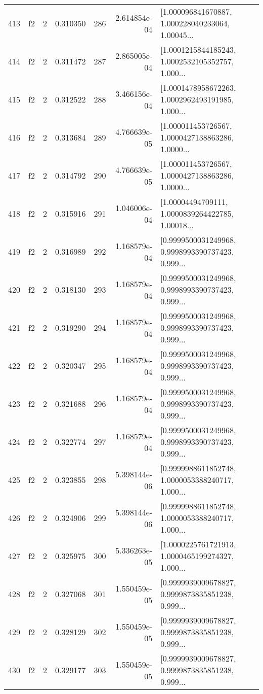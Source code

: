 \begin{tabular}{lllrlrl}
413 &  f2 &   2 &  0.310350 &  286 &  2.614854e-04 &  [1.000096841670887, 1.000228040233064, 1.00045... \\
414 &  f2 &   2 &  0.311472 &  287 &  2.865005e-04 &  [1.0001215844185243, 1.0002532105352757, 1.000... \\
415 &  f2 &   2 &  0.312522 &  288 &  3.466156e-04 &  [1.0001478958672263, 1.0002962493191985, 1.000... \\
416 &  f2 &   2 &  0.313684 &  289 &  4.766639e-05 &  [1.000011453726567, 1.0000427138863286, 1.0000... \\
417 &  f2 &   2 &  0.314792 &  290 &  4.766639e-05 &  [1.000011453726567, 1.0000427138863286, 1.0000... \\
418 &  f2 &   2 &  0.315916 &  291 &  1.046006e-04 &  [1.00004494709111, 1.0000839264422785, 1.00018... \\
419 &  f2 &   2 &  0.316989 &  292 &  1.168579e-04 &  [0.9999500031249968, 0.9998993390737423, 0.999... \\
420 &  f2 &   2 &  0.318130 &  293 &  1.168579e-04 &  [0.9999500031249968, 0.9998993390737423, 0.999... \\
421 &  f2 &   2 &  0.319290 &  294 &  1.168579e-04 &  [0.9999500031249968, 0.9998993390737423, 0.999... \\
422 &  f2 &   2 &  0.320347 &  295 &  1.168579e-04 &  [0.9999500031249968, 0.9998993390737423, 0.999... \\
423 &  f2 &   2 &  0.321688 &  296 &  1.168579e-04 &  [0.9999500031249968, 0.9998993390737423, 0.999... \\
424 &  f2 &   2 &  0.322774 &  297 &  1.168579e-04 &  [0.9999500031249968, 0.9998993390737423, 0.999... \\
425 &  f2 &   2 &  0.323855 &  298 &  5.398144e-06 &  [0.9999988611852748, 1.0000053388240717, 1.000... \\
426 &  f2 &   2 &  0.324906 &  299 &  5.398144e-06 &  [0.9999988611852748, 1.0000053388240717, 1.000... \\
427 &  f2 &   2 &  0.325975 &  300 &  5.336263e-05 &  [1.0000225761721913, 1.0000465199274327, 1.000... \\
428 &  f2 &   2 &  0.327068 &  301 &  1.550459e-05 &  [0.9999939009678827, 0.9999873835851238, 0.999... \\
429 &  f2 &   2 &  0.328129 &  302 &  1.550459e-05 &  [0.9999939009678827, 0.9999873835851238, 0.999... \\
430 &  f2 &   2 &  0.329177 &  303 &  1.550459e-05 &  [0.9999939009678827, 0.9999873835851238, 0.999... \\

\end{tabular}
